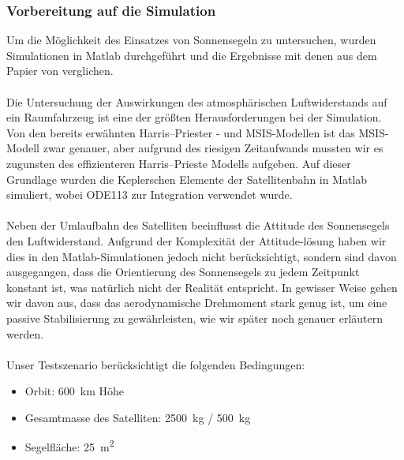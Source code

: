 \documentclass{article}
\begin{document}
\subsubsection{Vorbereitung auf die Simulation}
Um die Möglichkeit des Einsatzes von Sonnensegeln zu untersuchen, wurden Simulationen in Matlab durchgeführt und die Ergebnisse mit denen aus dem Papier von \citet{Daniele:2012} verglichen. \\\\
Die Untersuchung der Auswirkungen des atmosphärischen Luftwiderstands auf ein Raumfahrzeug ist eine der größten Herausforderungen bei der Simulation. Von den bereits erwähnten Harris–Priester - und MSIS-Modellen ist das MSIS-Modell zwar genauer, aber aufgrund des riesigen Zeitaufwands mussten wir es zugunsten des effizienteren Harris–Prieste Modells aufgeben. Auf dieser Grundlage wurden die Keplerschen Elemente der Satellitenbahn in Matlab simuliert, wobei ODE113 zur Integration verwendet wurde. \\\\
Neben der Umlaufbahn des Satelliten beeinflusst die Attitude des Sonnensegels den Luftwiderstand. Aufgrund der Komplexität der Attitude-lösung haben wir dies in den Matlab-Simulationen jedoch nicht berücksichtigt, sondern sind davon ausgegangen, dass die Orientierung des Sonnensegels zu jedem Zeitpunkt konstant ist, was natürlich nicht der Realität entspricht. In gewisser Weise gehen wir davon aus, dass das aerodynamische Drehmoment stark genug ist, um eine passive Stabilisierung zu gewährleisten, wie wir später noch genauer erläutern werden. \\\\
Unser Testszenario berücksichtigt die folgenden Bedingungen:
\begin{itemize}
	\item Orbit: \SI{600}{\kilo\meter} Höhe
	\item Gesamtmasse des Satelliten: \SI{2500}{\kilo\gram} / \SI{500}{\kilo\gram}
	\item Segelfläche: \SI{25}{\square \meter}
\end{itemize}
\end{document}
